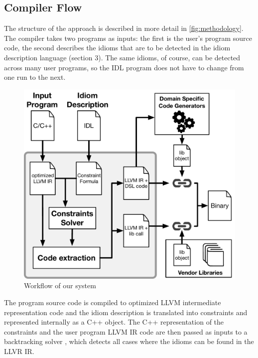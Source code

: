 \subsection{Compiler Flow}

    The structure of the approach is described in more detail in
    \autoref{fig:methodology}.
    The compiler takes two programs as inputs: the first is the user's program
    source code, the second describes the idioms that are to be detected in the
    idiom description language (section 3).
    The same idioms, of course, can be detected across many user programs, so
    the IDL program does not have to change from one run to the next.

\begin{figure}[t]
    \centering
    \includegraphics[width=\linewidth]{figures/compiler_flow.pdf}
    \caption{Workflow of our system}
    \label{fig:methodology}
    \vspace{-0.5em}
\end{figure}

    The program source code is compiled to optimized LLVM intermediate
    representation code and the idiom description is translated into constraints
    and represented internally as a C++ object.
    The C++ representation of the constraints and the user program LLVM IR code
    are then passed as inputs to a backtracking solver
    \cite{ginsbach2017discovery}, which detects all cases where the idioms can
    be found in the LLVR IR.

